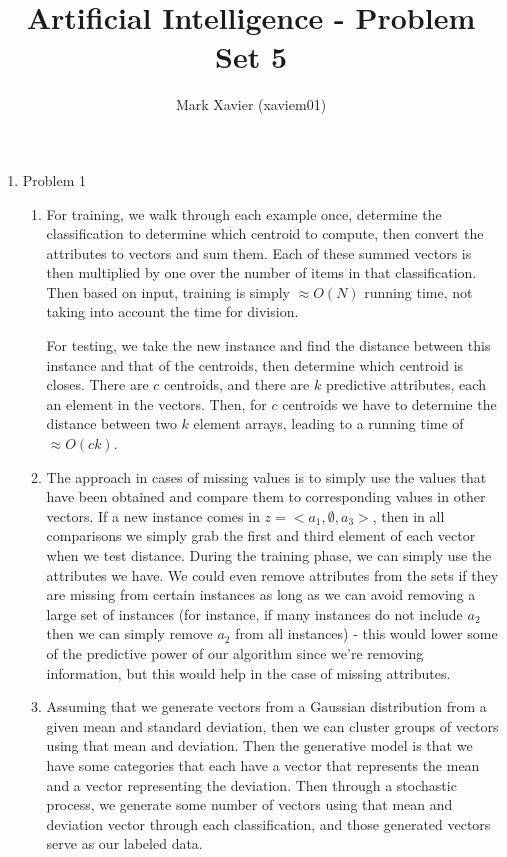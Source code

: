 \documentclass{article}
\title{Artificial Intelligence - Problem Set 5}
\author{Mark Xavier (xaviem01)}
\begin{document}
	\maketitle
	
	\begin{enumerate}
		\item Problem 1
		\begin{enumerate}
			\item For training, we walk through each example once, determine the classification to determine which centroid to compute, then convert the attributes to vectors and sum them.  Each of these summed vectors is then multiplied by one over the number of items in that classification.  Then based on input, training is simply $\approx O(N)$ running time, not taking into account the time for division.
			
			For testing, we take the new instance and find the distance between this instance and that of the centroids, then determine which centroid is closes.  There are $c$ centroids, and there are $k$ predictive attributes, each an element in the vectors.  Then, for $c$ centroids we have to determine the distance between two $k$ element arrays, leading to a running time of $\approx O(ck)$.
			
			\item The approach in cases of missing values is to simply use the values that have been obtained and compare them to corresponding values in other vectors.  If a new instance comes in $z = <a_1, \emptyset, a_3>$, then in all comparisons we simply grab the first and third element of each vector when we test distance.  During the training phase, we can simply use the attributes we have.  We could even remove attributes from the sets if they are missing from certain instances as long as we can avoid removing a large set of instances (for instance, if many instances do not include $a_2$ then we can simply remove $a_2$ from all instances) - this would lower some of the predictive power of our algorithm since we're removing information, but this would help in the case of missing attributes.
			
			\item Assuming that we generate vectors from a Gaussian distribution from a given mean and standard deviation, then we can cluster groups of vectors using that mean and deviation.  Then the generative model is that we have some categories that each have a vector that represents the mean and a vector representing the deviation.  Then through a stochastic process, we generate some number of vectors using that mean and deviation vector through each classification, and those generated vectors serve as our labeled data.
			

\end{enumerate}
\end{enumerate}
\end{document}
